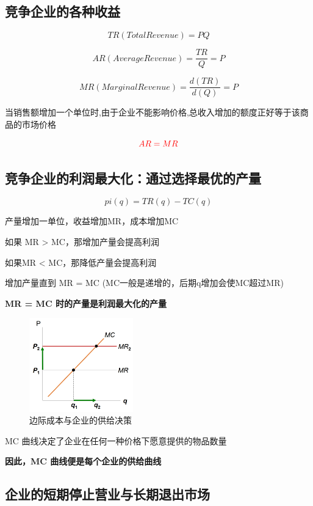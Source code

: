 \documentclass[12pt, a4paper]{article}
\begin{document}
\subsection{\textbf{竞争企业的各种收益}}

\[ TR (Total Revenue) = PQ \]

\[ AR (Average Revenue) = \frac{TR}{Q} = P \]

\[ MR (Marginal Revenue) = \frac{d(TR)}{d(Q)} = P\]

当销售额增加一个单位时,由于企业不能影响价格,总收入增加的额度正好等于该商品的市场价格

\[ \textcolor{red}{AR = MR} \]

\subsection{竞争企业的利润最大化：通过选择最优的产量}

\[pi(q) = TR(q) - TC(q)\]

产量增加一单位，收益增加MR，成本增加MC

如果 MR > MC，那增加产量会提高利润

如果MR < MC，那降低产量会提高利润

增加产量直到 MR = MC (MC一般是递增的，后期q增加会使MC超过MR)

\textbf{MR = MC 时的产量是利润最大化的产量}

\begin{figure}[H] 
  \centering %
  \includegraphics[width=0.4\textwidth]{完全竞争市场的企业利润最大化.png} 
  \caption{边际成本与企业的供给决策} %
\end{figure}

MC 曲线决定了企业在任何一种价格下愿意提供的物品数量

\textbf{因此，MC 曲线便是每个企业的供给曲线}



\subsection{企业的短期停止营业与长期退出市场}
\end{document}
